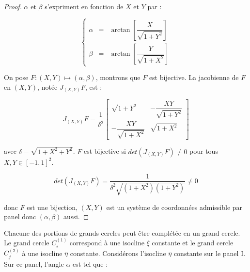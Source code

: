 \begin{proof}

$\alpha$ et $\beta$ s'expriment en fonction de $X$ et $Y$ par :

\begin{equation}
\left\lbrace
\begin{array}{rcl}
\alpha & = & \arctan \left[ \dfrac{X}{\sqrt{1+ Y^2}} \right] \\
\beta & = & \arctan \left[ \dfrac{Y}{\sqrt{1+X^2}} \right] 
\end{array}
\right.
\label{eq: alpha et beta fct de X et Y}
\end{equation}

On pose $F : (X,Y) \mapsto (\alpha,  \beta)$, montrons que $F$ est bijective. La jacobienne de $F$ en $(X,Y)$, notée $J_{(X,Y)}F$, est :

\begin{equation}
J_{(X,Y)}F = \dfrac{1}{\delta^2} 
\begin{bmatrix}
\sqrt{1+Y^2} & - \dfrac{XY}{\sqrt{1+Y^2}} \\
- \dfrac{XY}{\sqrt{1+X^2}} & \sqrt{1+X^2}
\end{bmatrix}
\end{equation}

avec $\delta = \sqrt{1+X^2+Y^2}$. $F$ est bijective si $det \left( J_{(X,Y)}F \right) \neq 0$ pour tous $X,Y \in [-1,1]^2$.

\begin{equation}
det \left( J_{(X,Y)}F \right) = \dfrac{1}{\delta^2 \sqrt{(1+X^2)(1+Y^2)}} \neq 0
\end{equation}

donc $F$ est une bijection, $(X,Y)$ est un système de coordonnées admissible par panel donc $(\alpha, \beta)$ aussi.

\end{proof}























Chacune des portions de grands cercles peut être complétée en un grand cercle. Le grand cercle $C_i^{(1)}$ correspond à une isocline $\xi$ constante et le grand cercle $C_j^{(2)}$ à une isocline $\eta$ constante. Considérons l'isocline $\eta$ constante sur le panel I. Sur ce panel, l'angle $\alpha$ est tel que :

